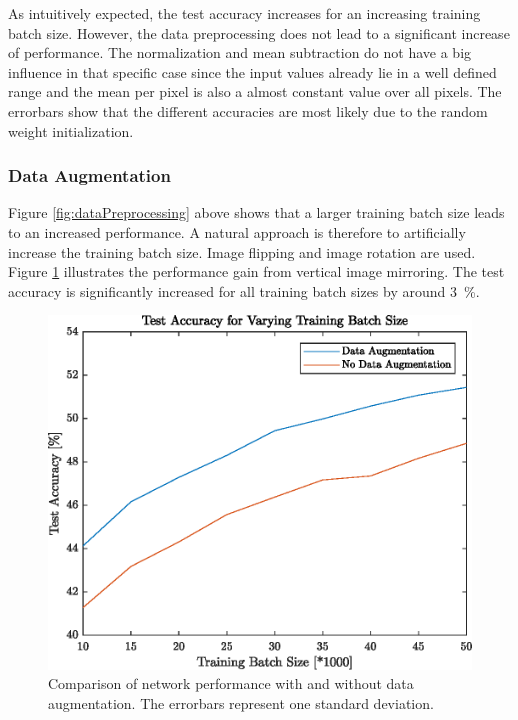    	As intuitively expected, the test accuracy increases for an increasing training batch size. However, the data preprocessing does not lead to a significant increase of performance. The normalization and mean subtraction do not have a big influence in that specific case since the input values already lie in a well defined range and the mean per pixel is also a almost constant value over all pixels. The errorbars show that the different accuracies are most likely due to the random weight initialization.

\FloatBarrier
\subsubsection{Data Augmentation}

   	Figure \ref{fig:dataPreprocessing} above shows that a larger training batch size leads to an increased performance. A natural approach is therefore to artificially increase the training batch size. Image flipping and image rotation are used. Figure \ref{fig:dataAugmentation} illustrates the performance gain from vertical image mirroring. The test accuracy is significantly increased for all training batch sizes by around \SI{3}{\percent}.

   	\begin{figure}[h!]
		\centering
   	  	\includegraphics{images/dataAugmentation}
   	  	\caption{Comparison of network performance with and without data augmentation. The errorbars represent one standard deviation.}
   	  	\label{fig:dataAugmentation}
   	\end{figure}
\FloatBarrier

